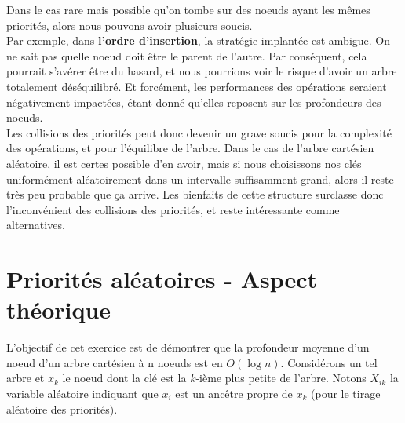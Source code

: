 \documentclass[a4paper,12pt]{report}
\begin{document}
\begin{tcolorbox}[colback=gray!10, colframe=blue!30, coltitle=black, title=La collision des priorités et les performances des opérations - 1/1]

    Dans le cas rare mais possible qu'on tombe sur des noeuds ayant les mêmes priorités, alors nous pouvons avoir plusieurs soucis.\\
    
    Par exemple, dans \textbf{l'ordre d'insertion}, la stratégie implantée est ambigue. On ne sait pas quelle noeud doit être le parent de l'autre. Par conséquent, cela 
        pourrait s'avérer être du hasard, et nous pourrions voir le risque d'avoir un arbre totalement déséquilibré. Et forcément, les performances des opérations 
        seraient négativement impactées, étant donné qu'elles reposent sur les profondeurs des noeuds.\\

    Les collisions des priorités peut donc devenir un grave soucis pour la complexité des opérations, et pour l'équilibre de l'arbre. Dans le cas de l'arbre cartésien
        aléatoire, il est certes possible d'en avoir, mais si nous choisissons nos clés uniformément aléatoirement dans un intervalle suffisamment grand, alors il
        reste très peu probable que ça arrive. Les bienfaits de cette structure surclasse donc l'inconvénient des collisions des priorités, et reste intéressante comme
        alternatives.

\end{tcolorbox}






\newpage

\renewcommand{\chaptername}{Exercice}
\chapter{Priorités aléatoires - Aspect théorique}

L'objectif de cet exercice est de démontrer que la profondeur moyenne d'un noeud d'un arbre cartésien à n noeuds est en \( O(\log n) \). Considérons un tel
    arbre et \( x_k \) le noeud dont la clé est la \( k \)-ième plus petite de l'arbre. Notons \( X_{ik} \) la variable aléatoire indiquant que \( x_i \) est
    un ancêtre propre de \( x_k \) (pour le tirage aléatoire des priorités).
\end{document}
